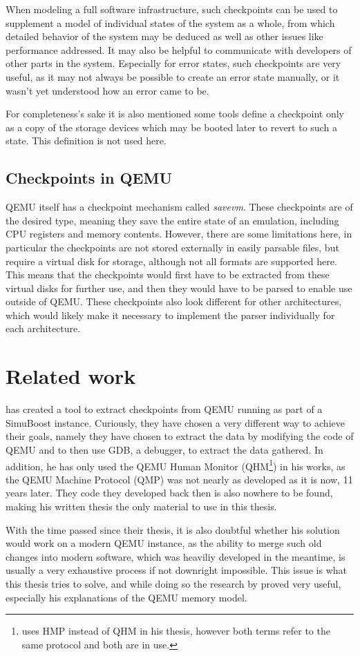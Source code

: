 When modeling a full software infrastructure,
such checkpoints can be used to supplement a model of individual states of the system as a whole,
from which detailed behavior of the system may be deduced
as well as other issues like performance addressed.
It may also be helpful to communicate with developers of other parts in the system.
Especially for error states, such checkpoints are very useful,
as it may not always be possible to create an error state manually,
or it wasn't yet understood how an error came to be.

For completeness's sake it is also mentioned some tools define a checkpoint only as a copy of the storage devices
which may be booted later to revert to such a state.
This definition is not used here.

\subsection{Checkpoints in QEMU}
QEMU itself has a checkpoint mechanism called \emph{savevm}.
These checkpoints are of the desired type, meaning they save the entire state of an emulation,
including CPU registers and memory contents.
However, there are some limitations here, in particular the checkpoints are not stored externally in easily parsable files,
but require a virtual disk for storage, although not all formats are supported here.
This means that the checkpoints would first have to be extracted from these virtual disks for further use,
and then they would have to be parsed to enable use outside of QEMU.
These checkpoints also look different for other architectures, which would likely make it necessary
to implement the parser individually for each architecture.

\section{Related work}
 has created a tool to extract checkpoints from QEMU running as part of a SimuBoost instance.
Curiously, they have chosen a very different way to achieve their goals,
namely they have chosen to extract the data by modifying the code of QEMU and to then use GDB,
a debugger, to extract the data gathered.
In addition, he has only used the QEMU Human Monitor (QHM\footnote{ uses HMP instead of QHM in his thesis, however both terms refer to the same protocol and both are in use.})
in his works, as the QEMU Machine Protocol (QMP) was not nearly as developed as it is now, 11 years later.
They code they developed back then is also nowhere to be found,
making his written thesis the only material to use in this thesis\cite{kitcheckpoints}.

With the time passed since their thesis,
it is also doubtful whether his solution would work on a modern QEMU instance,
as the ability to merge such old changes into modern software,
which was heaviliy developed in the meantime,
is usually a very exhaustive process if not downright impossible.
This issue is what this thesis tries to solve,
and while doing so the research by \citeauthor{kitcheckpoints} proved very useful,
especially his explanations of the QEMU memory model\cite{kitcheckpoints}.